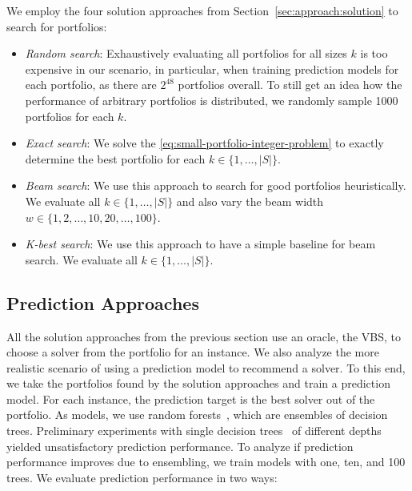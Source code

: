 \documentclass[conference]{IEEEtran}
\begin{document}
We employ the four solution approaches from Section~\ref{sec:approach:solution} to search for portfolios:

\begin{itemize}
	\item \emph{Random search}:
	Exhaustively evaluating all portfolios for all sizes $k$ is too expensive in our scenario, in particular, when training prediction models for each portfolio, as there are $2^{48}$ portfolios overall.
	To still get an idea how the performance of arbitrary portfolios is distributed, we randomly sample 1000 portfolios for each $k$.
	\item \emph{Exact search}:
	We solve the \ref{eq:small-portfolio-integer-problem} to exactly determine the best portfolio for each $k \in \{1, \dots, |S|\}$.
	\item \emph{Beam search}:
	We use this approach to search for good portfolios heuristically.
	We evaluate all $k \in \{1, \dots, |S|\}$ and also vary the beam width $w \in \{1, 2, \dots, 10, 20, \dots, 100\}$.
	\item \emph{K-best search}:
	We use this approach to have a simple baseline for beam search.
	We evaluate all $k \in \{1, \dots, |S|\}$.
\end{itemize}

\subsection{Prediction Approaches}

All the solution approaches from the previous section use an oracle, the VBS, to choose a solver from the portfolio for an instance.
We also analyze the more realistic scenario of using a prediction model to recommend a solver.
To this end, we take the portfolios found by the solution approaches and train a prediction model.
For each instance, the prediction target is the best solver out of the portfolio.
As models, we use random forests~\cite{breiman2001random}, which are ensembles of decision trees.
Preliminary experiments with single decision trees~\cite{breiman1984classification} of different depths yielded unsatisfactory prediction performance.
To analyze if prediction performance improves due to ensembling, we train models with one, ten, and 100 trees.
We evaluate prediction performance in two ways:
\end{document}
